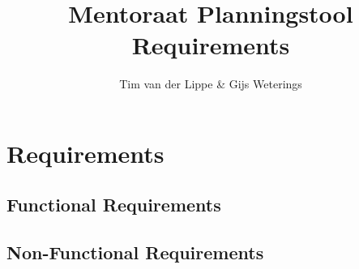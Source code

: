 \documentclass[a4paper,12pt]{article}
\begin{document}
\title{Mentoraat Planningstool Requirements}
\author{Tim van der Lippe \& Gijs Weterings}
\maketitle

\newpage

\tableofcontents

\newpage

\section{Requirements}

\subsection{Functional Requirements}



\subsection{Non-Functional Requirements}


\end{document}
